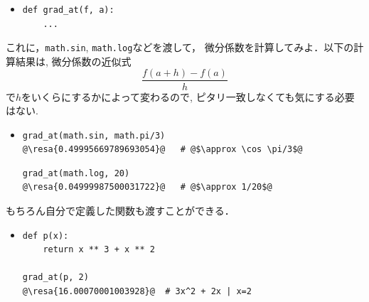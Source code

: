 \documentclass[10pt,dvipdfmx]{article}
\newcommand{\resa}[1]{ {\textsl{$\rightarrow$ #1}}}
\begin{document}
\begin{itemize}
\item []
\begin{lstlisting}
def grad_at(f, a):
    ...
\end{lstlisting}
\end{itemize}

これに，{\tt math.sin}, {\tt math.log}などを渡して，
微分係数を計算してみよ．以下の計算結果は,
微分係数の近似式
\[ \frac{f(a + h) - f(a)}{h} \]
で$h$をいくらにするかによって変わるので,
ピタリ一致しなくても気にする必要はない.

\begin{itemize}
\item []
\begin{lstlisting}
grad_at(math.sin, math.pi/3)
@\resa{0.49995669789693054}@   # @$\approx \cos \pi/3$@ 
\end{lstlisting}
\begin{lstlisting}
grad_at(math.log, 20)
@\resa{0.04999987500031722}@   # @$\approx 1/20$@ 
\end{lstlisting}
\end{itemize}

もちろん自分で定義した関数も渡すことができる．

\begin{itemize}
\item []
\begin{lstlisting}
def p(x):
    return x ** 3 + x ** 2

grad_at(p, 2)
@\resa{16.00070001003928}@  # 3x^2 + 2x | x=2
\end{lstlisting}
\end{itemize}

\end{document}
